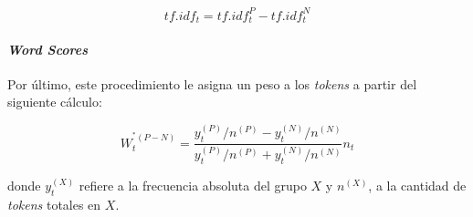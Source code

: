 \begin{equation*}
    tf.idf_{t} = tf.idf_{t}^{P}-tf.idf_{t}^{N}
\end{equation*}

\paragraph{\textit{Word Scores}}
\label{paragraph-methods-wordscores}
Por \'ultimo, este procedimiento le asigna un peso a los \textit{tokens}
a partir del siguiente c\'alculo:

\begin{equation*}
    W_{t}^{^*(P-N)} = \frac{
        y_{t}^{(P)}/n^{(P)}-y_{t}^{(N)}/n^{(N)}
        }{
            y_{t}^{(P)}/n^{(P)}+y_{t}^{(N)}/n^{(N)}
        }n_{t}
\end{equation*}

donde $y_{t}^{(X)}$ refiere a la frecuencia absoluta
del grupo $X$ y $n^{(X)}$, a la cantidad de \textit{tokens} totales en $X$.
